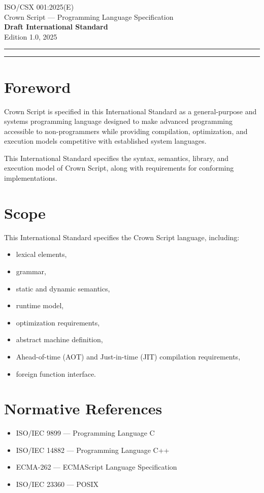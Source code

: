 \documentclass[12pt,a4paper]{article}
\begin{document}
\begin{center}
{\Huge ISO/CSX 001:2025(E)}\\[1ex]
{\huge Crown Script --- Programming Language Specification}\\[4ex]
\textbf{Draft International Standard}\\
Edition 1.0, 2025
\end{center}

\vspace{4ex}
\hrule
\vspace{2ex}
\tableofcontents
\vspace{2ex}
\hrule
\newpage

\section*{Foreword}
Crown Script is specified in this International Standard as a general-purpose and systems programming language designed to make advanced programming accessible to non-programmers while providing compilation, optimization, and execution models competitive with established system languages.

This International Standard specifies the syntax, semantics, library, and execution model of Crown Script, along with requirements for conforming implementations.

\newpage

\section{Scope}
This International Standard specifies the Crown Script language, including:
\begin{itemize}
\item lexical elements,
\item grammar,
\item static and dynamic semantics,
\item runtime model,
\item optimization requirements,
\item abstract machine definition,
\item Ahead-of-time (AOT) and Just-in-time (JIT) compilation requirements,
\item foreign function interface.
\end{itemize}

\section{Normative References}
\begin{itemize}
\item ISO/IEC 9899 --- Programming Language C
\item ISO/IEC 14882 --- Programming Language C++
\item ECMA-262 --- ECMAScript Language Specification
\item ISO/IEC 23360 --- POSIX
\end{itemize}
\end{document}

